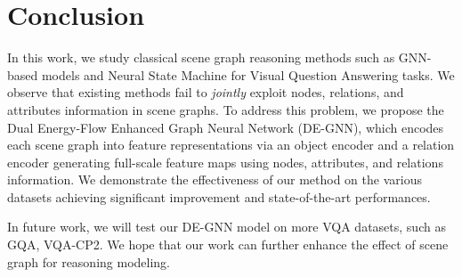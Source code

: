 \documentclass[letterpaper]{article} %
\begin{document}
\section{Conclusion}
In this work, we study classical scene graph reasoning methods such as GNN-based models and Neural State Machine for Visual Question Answering tasks. 
We observe that existing methods fail to \emph{jointly} exploit nodes, relations, and attributes information in scene graphs. 
To address this problem, we propose the Dual Energy-Flow Enhanced Graph Neural Network (DE-GNN), which encodes each scene graph into feature representations via an object encoder and a relation encoder generating full-scale feature maps using nodes, attributes, and relations information. 
We demonstrate the effectiveness of our method on the various datasets achieving significant improvement and state-of-the-art performances.

In future work, we will test our DE-GNN model on more VQA datasets, such as GQA, VQA-CP2. 
We hope that our work can further enhance the effect of scene graph for reasoning modeling.


\newpage


\clearpage

\end{document}
